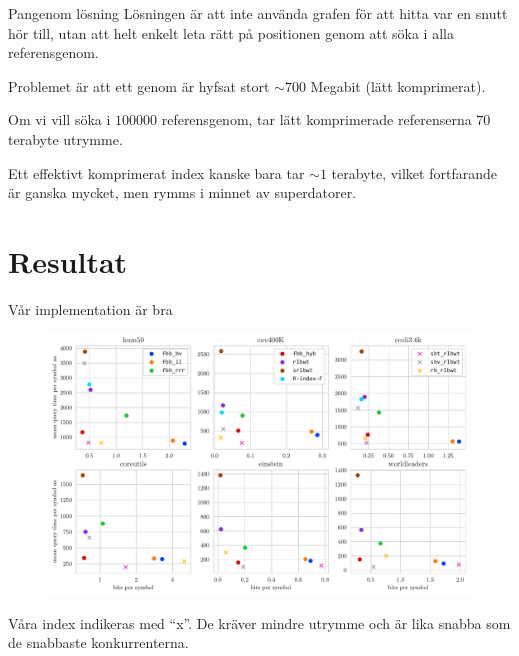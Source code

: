 \documentclass[11pt, aspectratio=169, table]{beamer}
\begin{document}
\begin{frame}{Pangenom lösning}
\setlength{\parskip}{\fill}
Lösningen är att inte använda grafen för att hitta var en snutt hör till, utan att helt 
enkelt leta rätt på positionen genom att söka i alla referensgenom.

Problemet är att ett genom är hyfsat stort $\sim 700$ Megabit (lätt komprimerat).

Om vi vill söka i $100000$ referensgenom, tar lätt komprimerade referenserna $70$ terabyte utrymme.

Ett effektivt komprimerat index kanske bara tar $\sim 1$ terabyte, vilket fortfarande är ganska mycket, 
men rymms i minnet av superdatorer.
\end{frame}

\section{Resultat}
\begin{frame}{Vår implementation är bra}
\begin{figure}
\centering
\includegraphics[trim={0 8cm 0 0},clip,width=\textwidth]{amd_pattern_count_30.pdf}
\end{figure}

Våra index indikeras med ``x''. De kräver mindre utrymme och är lika snabba som de snabbaste konkurrenterna.
\end{frame}

%
\end{document}
